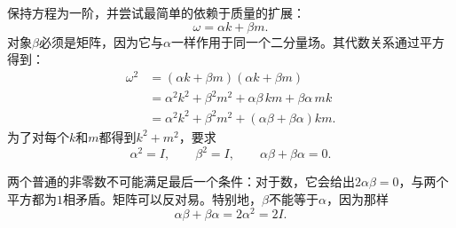 \begin{classroomqa}
\end{classroomqa}

\begin{classroomqa}
\end{classroomqa}

保持方程为一阶，并尝试最简单的依赖于质量的扩展：
\begin{equation}
\omega=\alpha k+\beta m.
\end{equation}
对象\(\beta\)必须是矩阵，因为它与\(\alpha\)一样作用于同一个二分量场。其代数关系通过平方得到：
\begin{align}
\omega^2
&=(\alpha k+\beta m)(\alpha k+\beta m)\\
&=\alpha^2k^2+\beta^2m^2
+\alpha\beta\,km+\beta\alpha\,mk\\
&=\alpha^2k^2+\beta^2m^2
+(\alpha\beta+\beta\alpha)km.
\end{align}
为了对每个\(k\)和\(m\)都得到\(k^2+m^2\)，要求
\begin{equation}
\alpha^2=I,
\qquad
\beta^2=I,
\qquad
\alpha\beta+\beta\alpha=0.
\end{equation}

两个普通的非零数不可能满足最后一个条件：对于数，它会给出\(2\alpha\beta=0\)，与两个平方都为\(1\)相矛盾。矩阵可以反对易。特别地，\(\beta\)不能等于\(\alpha\)，因为那样
\begin{equation}
\alpha\beta+\beta\alpha=2\alpha^2=2I.
\end{equation}

